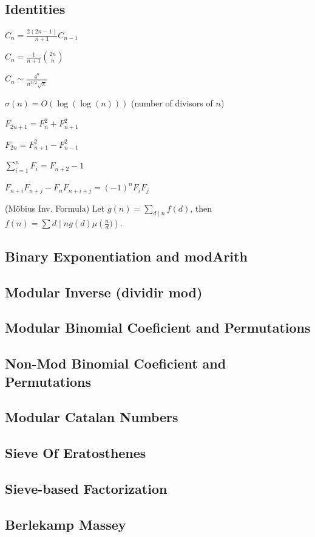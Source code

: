 \subsection{Identities}
{
$C_n = \frac{2(2n-1)}{n+1} C_{n-1}$

$C_n = \frac{1}{n+1} \binom{2n}{n}$

$C_n \sim \frac{4^n}{n^{3/2}\sqrt{\pi}}$

$\sigma(n) = O(\log(\log(n)))$ (number of divisors of $n$)

$F_{2n+1} = F_{n}^2 + F_{n+1}^2$

$F_{2n} = F_{n+1}^2 - F_{n-1}^2$

$\sum_{i=1}^n F_i = F_{n+2}-1$

$F_{n+i}F_{n+j} - F_nF_{n+i+j} = (-1)^n F_iF_j$

(Möbius Inv. Formula)
Let $g(n) = \sum_{d\mid n} f(d)$, then $f(n)=\sum{d\mid n} g(d) \mu\left(\frac{n}{d})\right)$.
}
\subsection{Binary Exponentiation and modArith}
\subsection{Modular Inverse (dividir mod)}
\subsection{Modular Binomial Coeficient and Permutations}
\subsection{Non-Mod Binomial Coeficient and Permutations}
\subsection{Modular Catalan Numbers}
\subsection{Sieve Of Eratosthenes}
\subsection{Sieve-based Factorization}
\subsection{Berlekamp Massey}
